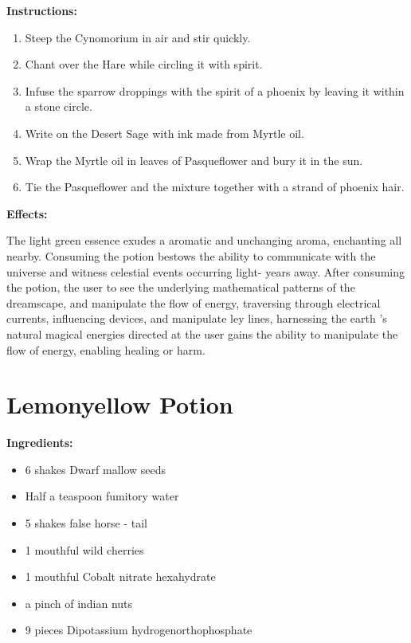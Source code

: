 \documentclass{article}
\begin{document}
\textbf{Instructions:}

\begin{enumerate}
  \item Steep the Cynomorium in air and stir quickly.
  \item Chant over the Hare while circling it with spirit.
  \item Infuse the sparrow droppings with the spirit of a phoenix by leaving it within a stone circle.
  \item Write on the Desert Sage with ink made from Myrtle oil.
  \item Wrap the Myrtle oil in leaves of Pasqueflower and bury it in the sun.
  \item Tie the Pasqueflower and the mixture together with a strand of phoenix hair.
\end{enumerate}

\textbf{Effects:}

The light green essence exudes a aromatic and unchanging aroma, enchanting all nearby. Consuming the potion bestows the ability to communicate with the universe and witness celestial events occurring light- years away. After consuming the potion, the user to see the underlying mathematical patterns of the dreamscape, and manipulate the flow of energy, traversing through electrical currents, influencing devices, and manipulate ley lines, harnessing the earth 's natural magical energies directed at the user gains the ability to manipulate the flow of energy, enabling healing or harm.

\newpage
\section*{Lemonyellow Potion}

\textbf{Ingredients:}

\begin{itemize}
  \item 6 shakes Dwarf mallow seeds
  \item Half a teaspoon fumitory water
  \item 5 shakes false horse - tail
  \item 1 mouthful wild cherries
  \item 1 mouthful Cobalt nitrate hexahydrate
  \item a pinch of indian nuts
  \item 9 pieces Dipotassium hydrogenorthophosphate
\end{itemize}
\end{document}
